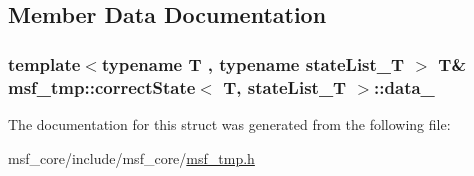 \subsection{Member Data Documentation}
\hypertarget{structmsf__tmp_1_1correctState_a683999c91aa093782b7356bd9436a810}{
\subsubsection[{data\-\_\-}]{\setlength{\rightskip}{0pt plus 5cm}template$<$typename T , typename state\-List\-\_\-\-T $>$ T\& {\bf msf\-\_\-tmp\-::correct\-State}$<$ T, state\-List\-\_\-\-T $>$\-::data\-\_\-\hspace{0.3cm}{\ttfamily [private]}}}\label{structmsf__tmp_1_1correctState_a683999c91aa093782b7356bd9436a810}


The documentation for this struct was generated from the following file\-:\begin{DoxyCompactItemize}
\item 
msf\-\_\-core/include/msf\-\_\-core/\hyperlink{msf__tmp_8h}{msf\-\_\-tmp.\-h}\end{DoxyCompactItemize}
